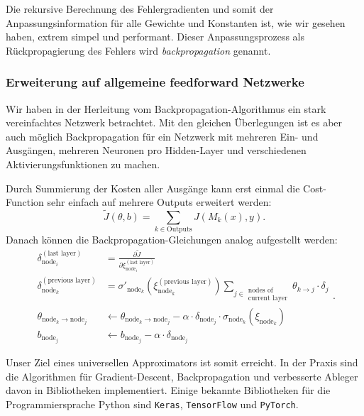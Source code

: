Die rekursive Berechnung des Fehlergradienten und somit der Anpassungsinformation für alle
Gewichte und Konstanten ist, wie wir gesehen haben, extrem simpel und performant.
Dieser Anpassungsprozess als Rückpropagierung des Fehlers wird \emph{backpropagation} genannt.

\subsubsection{Erweiterung auf allgemeine feedforward Netzwerke}

Wir haben in der Herleitung vom Backpropagation-Algorithmus ein stark vereinfachtes
Netzwerk betrachtet. Mit den gleichen Überlegungen ist es aber auch möglich
Backpropagation für ein Netzwerk mit mehreren Ein- und Ausgängen, mehreren Neuronen pro
Hidden-Layer und verschiedenen Aktivierungsfunktionen zu machen.

Durch Summierung der Kosten aller Ausgänge kann erst einmal die Cost-Function sehr einfach
auf mehrere Outputs erweitert werden:
\[
    \tilde J(\theta, b) = \sum_{k\in \text{Outputs}} J(M_k(x), y).
\]
Danach können die Backpropagation-Gleichungen analog aufgestellt werden:
\begin{equation}
\begin{aligned}
    \delta_{\text{node}_i}^{(\text{last layer})} &=
        \frac{\partial \tilde J}{\partial \xi_{\text{node}_i}^{(\text{last layer})}} \\
    \delta_{\text{node}_k}^{(\text{previous layer})} &=
        \sigma'_{\text{node}_k} \left( \xi_{\text{node}_k}^{(\text{previous layer})} \right) 
        \sum_{j\in \substack{\text{nodes of}\\\text{current layer}}}
        \theta_{k\rightarrow j} \cdot \delta_j\\
    \theta_{\text{node}_k\rightarrow\text{node}_j} &\leftarrow
        \theta_{\text{node}_k\rightarrow\text{node}_j} -
        \alpha \cdot \delta_{\text{node}_j} \cdot \sigma_{\text{node}_k}(\xi_{\text{node}_k}) \\
    b_{\text{node}_j} &\leftarrow b_{\text{node}_j} - \alpha \cdot \delta_{\text{node}_j}
\end{aligned}.
\label{ml:ann:bp:update}
\end{equation}

\bigskip
Unser Ziel eines universellen Approximators ist somit erreicht. In der Praxis sind die
Algorithmen für Gradient-Descent, Backpropagation und verbesserte Ableger davon in
Bibliotheken implementiert. Einige bekannte Bibliotheken für die Programmiersprache Python
sind \texttt{Keras}, \texttt{TensorFlow} und \texttt{PyTorch}.